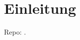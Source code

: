 %
%
%
\chapter{Einleitung
\label{buch:chapter:einleitung}}
\kopfrechts{}
Repo: \cite{buch:repo}.

%

